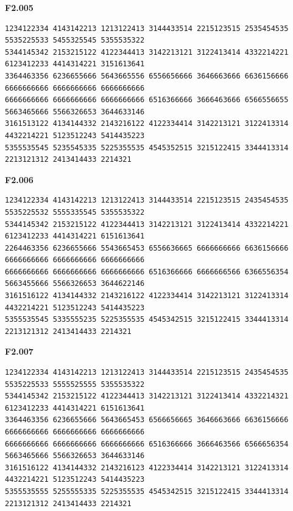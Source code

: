 \noindent\begin{minipage}{\linewidth}\textbf{F2.005}
\begin{lstlisting}
1234122334 4143142213 1213122413 3144433514 2215123515 2535454535 5535225533 5455325545 5355535322
5344145342 2153215122 4122344413 3142213121 3122413414 4332214221 6123412233 4414314221 3151613641
3364463356 6236655666 5643665556 6556656666 3646663666 6636156666 6666666666 6666666666 6666666666
6666666666 6666666666 6666666666 6516366666 3666463666 6566556655 5663465666 5566326653 3644633146
3161513122 4134144332 2143216122 4122334414 3142213121 3122413314 4432214221 5123512243 5414435223
5355535545 5235545335 5225355535 4545352515 3215122415 3344413314 2213121312 2413414433 2214321
\end{lstlisting}
\end{minipage}\par\smallskip

\noindent\begin{minipage}{\linewidth}\textbf{F2.006}
\begin{lstlisting}
1234122334 4143142213 1213122413 3144433514 2215123515 2435454535 5535225532 5555335545 5355535322
5344145342 2153215122 4122344413 3142213121 3122413414 4332214221 6123412233 4414314221 6151613641
2264463356 6236655666 5543665453 6556636665 6666666666 6636156666 6666666666 6666666666 6666666666
6666666666 6666666666 6666666666 6516366666 6666666566 6366556354 5663455666 5566326653 3644622146
3161516122 4134144332 2143216122 4122334414 3142213121 3122413314 4432214221 5123512243 5414435223
5355535545 5335555235 5225355535 4545342515 3215122415 3344413314 2213121312 2413414433 2214321
\end{lstlisting}
\end{minipage}\par\smallskip

\noindent\begin{minipage}{\linewidth}\textbf{F2.007}
\begin{lstlisting}
1234122334 4143142213 1213122413 3144433514 2215123515 2435454535 5535225533 5555525555 5355535322
5344145342 2153215122 4122344413 3142213121 3122413414 4332214321 6123412233 4414314221 6151613641
3364463356 6236655666 5643665453 6566656665 3646663666 6636156666 6666666666 6666666666 6666666666
6666666666 6666666666 6666666666 6516366666 3666463566 6566656354 5663465666 5566326653 3644633146
3161516122 4134144332 2143216123 4122334414 3142213121 3122413314 4432214221 5123512243 5414435223
5355535555 5255555335 5225355535 4545342515 3215122415 3344413314 2213121312 2413414433 2214321
\end{lstlisting}
\end{minipage}\par\smallskip


